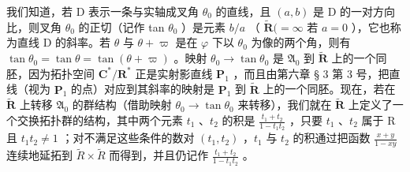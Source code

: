 我们知道，若 D 表示一条与实轴成叉角 \(\theta_0\) 的直线，且 \((a, b)\) 是 D 的一对方向比，则叉角 \(\theta_0\) 的正切（记作 tan \(\theta_0\) ）是元素 \(b/a\) （ \(\tilde{\mathbf{R}} (= \infty\) 若 \(a = 0\) ），它也称为直线 D 的斜率。若 \(\theta\) 与 \(\theta + \varpi\) 是在 \(\varphi\) 下以 \(\theta_0\) 为像的两个角，则有 \(\tan \theta_0 = \tan \theta = \tan (\theta + \varpi)\) 。映射 \(\theta_0 \to \tan \theta_0\) 是 \(\mathfrak{A}_0\) 到 \(\tilde{\mathbf{R}}\) 上的一个同胚，因为拓扑空间 \(\mathbf{C}^*/\mathbf{R}^*\) 正是实射影直线 \(\mathbf{P}_1\) ，而且由第六章 § 3 第 3 号，把直线（视为 \(\mathbf{P}_1\) 的点）对应到其斜率的映射是 \(\mathbf{P}_1\) 到 \(\tilde{\mathbf{R}}\) 上的一个同胚。现在，若在 \(\tilde{\mathbf{R}}\) 上转移 \(\mathfrak{A}_0\) 的群结构（借助映射 \(\theta_0 \to \tan \theta_0\) 来转移），我们就在 \(\tilde{\mathbf{R}}\) 上定义了一个交换拓扑群的结构，其中两个元素 \(t_1\) 、\(t_2\) 的积是 \(\frac{t_1 + t_2}{1 - t_1 t_2}\) ，只要 \(t_1\) 、\(t_2\) 属于 R 且 \(t_1 t_2 \neq 1\) ；对不满足这些条件的数对 \((t_1, t_2)\) ，\(t_{1}\) 与 \(t_{2}\) 的积通过把函数 \(\frac{x+y}{1-xy}\) 连续地延拓到 \(\tilde{R}\times\tilde{R}\) 而得到，并且仍记作 \(\frac{t_{1}+t_{2}}{1-t_{1}t_{2}}\) 。

